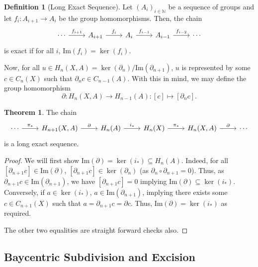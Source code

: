 \documentclass[]{article}
\theoremstyle{definition}
\newtheorem{theorem}{Theorem}
\theoremstyle{definition}
\newtheorem{definition}{Definition}[section]
\begin{document}
\begin{definition}[Long Exact Sequence]
  Let \((A_i)_{i \in \mathbb{N}}\) be a sequence of groups and let 
  \(f_i : A_{i + 1} \to A_i\) be the group homomorphisms. Then, the chain 
  \[\begin{tikzcd}
    \cdots & {A_{i + 1}} & {A_i} & {A_{i - 1}} & \cdots
    \arrow["{f_i}", from=1-2, to=1-3]
    \arrow["{f_{i + 1}}", from=1-1, to=1-2]
    \arrow["{f_{i - 1}}", from=1-3, to=1-4]
    \arrow["{f_{i - 2}}", from=1-4, to=1-5]
  \end{tikzcd}\]
  is exact if for all \(i\), \(\text{Im}(f_i) = \ker(f_i)\).
\end{definition}

Now, for all \(u \in H_n(X, A) = \ker(\partial_n) / \text{Im}(\partial_{n + 1})\),
\(u\) is represented by some \(c \in C_n(X)\) such that 
\(\partial_n c \in C_{n - 1}(A)\). With this in mind, we may define the 
group homomorphism 
\[\partial : H_n(X, A) \to H_{n - 1}(A) : [c] \mapsto [\partial_n c].\]

\begin{theorem}
  The chain
  \[\begin{tikzcd}
    \cdots & {H_{n + 1}(X, A)} & {H_n(A)} & {H_n(X)} & {H_n(X, A)} & \cdots
    \arrow["\pi_*", from=1-1, to=1-2]
    \arrow["\partial", from=1-2, to=1-3]
    \arrow["{i_*}", from=1-3, to=1-4]
    \arrow["{\pi_*}", from=1-4, to=1-5]
    \arrow["\partial", from=1-5, to=1-6]
  \end{tikzcd}\]
  is a long exact sequence.
\end{theorem}
\begin{proof}
  We will first show \(\text{Im}(\partial) = \ker(i_*) \subseteq H_n(A)\). 
  Indeed, for all \([\partial_{n + 1} c] \in \text{Im}(\partial)\), 
  \([\partial_{n + 1} c] \in \ker(\partial_n)\) (as \(\partial_n \circ \partial_{n + 1} = 0\)).
  Thus, as \(\partial_{n + 1}c \in \text{Im}(\partial_{n + 1})\), we have 
  \([\partial_{n + 1} c] = 0\) implying \(\text{Im}(\partial) \subseteq \ker(i_*)\).
  Conversely, if \(a \in \ker(i_*)\), \(a \in \text{Im}(\partial_{n + 1})\), 
  implying there exists some \(c \in C_{n + 1}(X)\) such that 
  \(a = \partial_{n + 1} c = \partial c\). Thus, 
  \(\text{Im}(\partial) = \ker(i_*)\) as required. 

  The other two equalities are straight forward checks also.
\end{proof}

\subsection{Baycentric Subdivision and Excision}
\end{document}
